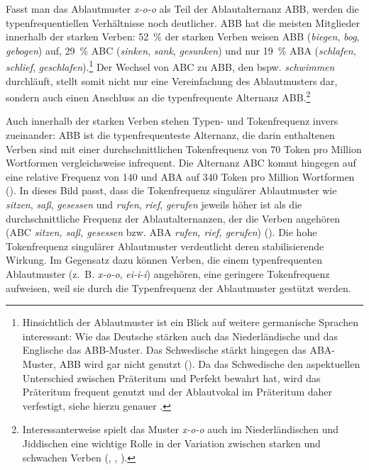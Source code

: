 Fasst man das Ablautmuster \textit{x-o-o} als Teil der Ablautalternanz ABB, werden die typenfrequentiellen Verhältnisse noch deutlicher. ABB hat die meisten Mitglieder innerhalb der starken Verben:   52~\% der starken Verben weisen ABB (\textit{biegen}, \textit{bog}, \textit{gebogen}) auf, 29~\% ABC (\textit{sinken}, \textit{sank}, \textit{gesunken}) und nur 19~\% ABA (\textit{schlafen}, \textit{schlief}, \textit{geschlafen}).\footnote{Hinsichtlich der Ablautmuster ist ein Blick auf weitere germanische Sprachen interessant: Wie das Deutsche stärken auch das Niederländische und das Englische das ABB-Muster. Das Schwedische stärkt hingegen das ABA-Muster, ABB wird gar nicht genutzt (\cite[340--342]{Dammel.2010b}). Da das Schwedische den aspektuellen Unterschied zwischen Präteritum und Perfekt bewahrt hat, wird das Präteritum frequent genutzt und der Ablautvokal im Präteritum daher verfestigt, siehe hierzu genauer \textcite{Dammel.2010b}.} Der Wechsel von ABC zu ABB, den bspw. \textit{schwimmen} durchläuft, stellt somit nicht nur eine Vereinfachung des Ablautmusters dar, sondern auch einen Anschluss an die typenfrequente Alternanz ABB.\footnote{Interessanterweise spielt das Muster \textit{x-o-o} auch im Niederländischen und Jiddischen eine wichtige Rolle in der Variation zwischen starken und schwachen Verben (\cite[437--443]{Nowak.2010}, \cite{Nowak.2010b}, \cite[235--237]{Schafer.2023}).} 



Auch innerhalb der starken Verben stehen Typen- und Tokenfrequenz invers zueinander: ABB ist die typenfrequenteste Alternanz, die darin enthaltenen Verben sind mit einer durchschnittlichen Tokenfrequenz von 70 Token pro Million Wortformen vergleichsweise infrequent. Die Alternanz ABC kommt hingegen auf eine relative Frequenz von 140 und ABA auf 340 Token pro Million Wortformen (\cite[165--166]{Nowak.2015}). In dieses Bild passt, dass die Tokenfrequenz singulärer Ablautmuster wie \textit{sitzen}, \textit{saß}, \textit{gesessen} und \textit{rufen}, \textit{rief}, \textit{gerufen} jeweils höher ist als die durchschnittliche Frequenz der Ablautalternanzen, der die Verben angehören (ABC \textit{sitzen, saß, gesessen} bzw. ABA \textit{rufen, rief, gerufen}) (\cite[161--162]{Nowak.2018}). Die hohe Tokenfrequenz singulärer Ablautmuster verdeutlicht deren stabilisierende Wirkung. Im Gegensatz dazu können Verben, die einem typenfrequenten Ablautmuster (z.~B. \textit{x-o-o}, \textit{ei-i-i}) angehören, eine geringere Tokenfrequenz aufweisen, weil sie durch die Typenfrequenz der Ablautmuster gestützt werden.



